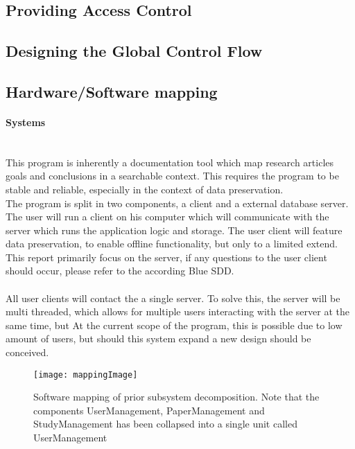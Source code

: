 \subsection{Providing Access Control}

\subsection{Designing the Global Control Flow}
    

\subsection{Hardware/Software mapping}
\paragraph{Systems}\mbox{}\\
This program is inherently a documentation tool which map research articles goals and conclusions in a searchable context. This requires the program to be stable and reliable, especially  in the context of data preservation. \\The program is split in two components, a client and a external database  server. The user will run a client on his computer which will communicate with the server which runs the application logic and storage. The user client will feature data preservation, to enable offline functionality, but only to a limited extend. This report primarily focus on the server, if any questions to the user client should occur,  please refer to the according Blue SDD.\\ \\
All user clients will contact the a single server. To solve this, the server will be multi threaded, which allows for multiple users interacting with the server at the same time, but  At the current scope of the program, this is possible due to low amount of users, but should this system expand a new design should be conceived. \\
\begin{figure}[H]
	\texttt{[image: mappingImage]}
	\caption{ Software mapping of prior subsystem decomposition. Note that the components UserManagement, PaperManagement and StudyManagement has been collapsed into a single unit called UserManagement }
\end{figure}
